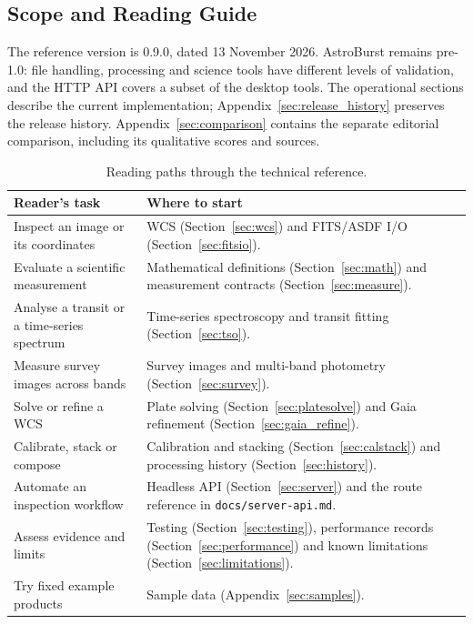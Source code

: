 \documentclass[11pt,a4paper]{article}
\newcommand{\code}[1]{\texttt{\small #1}}
\begin{document}
    \subsection{Scope and Reading Guide}
    \label{sec:scope}

    The reference version is 0.9.0, dated 13 November 2026. AstroBurst remains pre-1.0: file handling, processing and science tools have different levels of validation, and the HTTP API covers a subset of the desktop tools. The operational sections describe the current implementation; Appendix~\ref{sec:release_history} preserves the release history. Appendix~\ref{sec:comparison} contains the separate editorial comparison, including its qualitative scores and sources.

    \begin{table}[H]
    \centering
    \small
    \begin{tabularx}{\textwidth}{p{4cm}X}
    \toprule
    \textbf{Reader's task} & \textbf{Where to start} \\
    \midrule
    Inspect an image or its coordinates & WCS (Section~\ref{sec:wcs}) and FITS/ASDF I/O (Section~\ref{sec:fitsio}). \\
    Evaluate a scientific measurement & Mathematical definitions (Section~\ref{sec:math}) and measurement contracts (Section~\ref{sec:measure}). \\
    Analyse a transit or a time-series spectrum & Time-series spectroscopy and transit fitting (Section~\ref{sec:tso}). \\
    Measure survey images across bands & Survey images and multi-band photometry (Section~\ref{sec:survey}). \\
    Solve or refine a WCS & Plate solving (Section~\ref{sec:platesolve}) and Gaia refinement (Section~\ref{sec:gaia_refine}). \\
    Calibrate, stack or compose & Calibration and stacking (Section~\ref{sec:calstack}) and processing history (Section~\ref{sec:history}). \\
    Automate an inspection workflow & Headless API (Section~\ref{sec:server}) and the route reference in \code{docs/server-api.md}. \\
    Assess evidence and limits & Testing (Section~\ref{sec:testing}), performance records (Section~\ref{sec:performance}) and known limitations (Section~\ref{sec:limitations}). \\
    Try fixed example products & Sample data (Appendix~\ref{sec:samples}). \\
    \bottomrule
    \end{tabularx}
    \caption{Reading paths through the technical reference.}
    \end{table}
\end{document}
